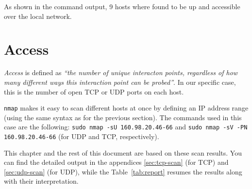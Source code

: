 \documentclass[10pt,a4paper,twoside,onecolumn]{article}
\begin{document}
As shown in the command output, 9 hosts where found to be up and accessible over the local network.


\section{Access}

\textit{Access} is defined as \textit{``the number of unique interacton points, regardless of how many different ways this interaction point can be probed''}. In our specific case, this is the number of open TCP or UDP ports on each host.

\texttt{nmap} makes it easy to scan different hosts at once by defining an IP address range (using the same syntax as for the previous section). The commands used in this case are the following: \texttt{sudo nmap -sU 160.98.20.46-66} and \texttt{sudo nmap -sV -PN 160.98.20.46-66} (for UDP and TCP, respectively).

This chapter and the rest of this document are based on these scan results. You can find the detailed output in the appendices \ref{sec:tcp-scan} (for TCP) and \ref{sec:udp-scan} (for UDP), while the Table~\vref{tab:report} resumes the results along with their interpretation.
\end{document}
